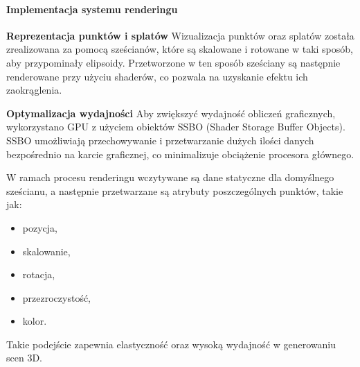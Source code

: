 \paragraph{Implementacja systemu renderingu}

\textbf{Reprezentacja punktów i splatów}
Wizualizacja punktów oraz splatów została zrealizowana za pomocą sześcianów, które są skalowane i rotowane w taki sposób, aby przypominały elipsoidy. Przetworzone w ten sposób sześciany są następnie renderowane przy użyciu shaderów, co pozwala na uzyskanie efektu ich zaokrąglenia.

\textbf{Optymalizacja wydajności}
Aby zwiększyć wydajność obliczeń graficznych, wykorzystano GPU z użyciem obiektów SSBO (Shader Storage Buffer Objects). SSBO umożliwiają przechowywanie i przetwarzanie dużych ilości danych bezpośrednio na karcie graficznej, co minimalizuje obciążenie procesora głównego.

W ramach procesu renderingu wczytywane są dane statyczne dla domyślnego sześcianu, a następnie przetwarzane są atrybuty poszczególnych punktów, takie jak:
\begin{itemize}
    \item pozycja,
    \item skalowanie,
    \item rotacja,
    \item przezroczystość,
    \item kolor.
\end{itemize}

Takie podejście zapewnia elastyczność oraz wysoką wydajność w generowaniu scen 3D.